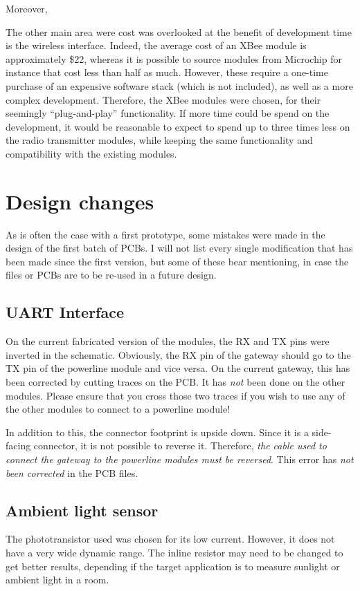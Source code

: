 Moreover,

The other main area were cost was overlooked at the benefit of development time
is the wireless interface. Indeed, the average cost of an XBee module is
approximately \$22, whereas it is possible to source modules from Microchip for
instance that cost less than half as much. However, these require a one-time
purchase of an expensive software stack (which is not included), as well as a
more complex development. Therefore, the XBee modules were chosen, for their
seemingly ``plug-and-play'' functionality. If more time could be spend on the
development, it would be reasonable to expect to spend up to three times less on
the radio transmitter modules, while keeping the same functionality and
compatibility with the existing modules.

\section{Design changes}
\label{sec:design-changes}

As is often the case with a first prototype, some mistakes were made in the
design of the first batch of PCBs. I will not list every single modification
that has been made since the first version, but some of these bear mentioning,
in case the files or PCBs are to be re-used in a future design.

\subsection{UART Interface}
On the current fabricated version of the modules, the RX and TX pins were
inverted in the schematic. Obviously, the RX pin of the gateway should go to the
TX pin of the powerline module and vice versa. On the current gateway, this has
been corrected by cutting traces on the PCB. It has \emph{not} been done on the
other modules. Please ensure that you cross those two traces if you wish to use
any of the other modules to connect to a powerline module!

In addition to this, the connector footprint is upside down. Since it is a
side-facing connector, it is not possible to reverse it. Therefore, \emph{the
cable used to connect the gateway to the powerline modules must be reversed}.
This error has \emph{not been corrected} in the PCB files.

\subsection{Ambient light sensor}
The phototransistor used was chosen for its low current. However, it does not
have a very wide dynamic range. The inline resistor may need to be changed to
get better results, depending if the target application is to measure sunlight
or ambient light in a room.

